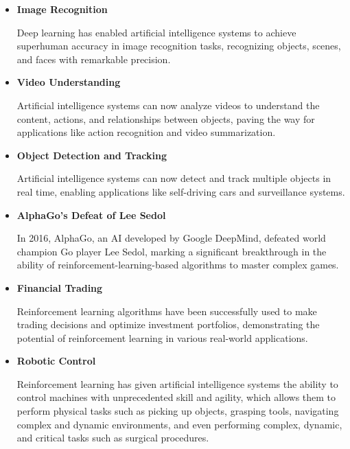 \documentclass[masterthesis]{fer}
\begin{document}
\begin{itemize}
    \item \textbf{Image Recognition}
    
    Deep learning has enabled artificial intelligence systems
    to achieve superhuman accuracy in image recognition tasks,
    recognizing objects, scenes, and faces with remarkable precision.

    \item \textbf{Video Understanding}
    
    Artificial intelligence systems can now
    analyze videos to understand the content, actions, and relationships between objects,
    paving the way for applications like action recognition and video summarization.

    \item \textbf{Object Detection and Tracking}
    
    Artificial intelligence systems can now
    detect and track multiple objects in real time,
    enabling applications like self-driving cars and surveillance systems.
    
    \item \textbf{AlphaGo's Defeat of Lee Sedol}
    
    In 2016, AlphaGo, an AI developed by Google DeepMind, defeated world champion Go player Lee Sedol, marking a significant breakthrough in the ability of reinforcement-learning-based algorithms to master complex games.
    
    \item \textbf{Financial Trading}
    
    Reinforcement learning algorithms have been successfully used to make trading decisions and optimize investment portfolios, demonstrating the potential of reinforcement learning in various real-world applications.
    
    \item \textbf{Robotic Control}
    
    Reinforcement learning has given artificial intelligence systems the ability to control machines with unprecedented skill and agility, which allows them to perform physical tasks such as picking up objects, grasping tools, navigating complex and dynamic environments, and even performing complex, dynamic, and critical tasks such as surgical procedures.
    \cite{saeidi_opfermann_kam_wei_leonard_hsieh_kang_krieger_2022}
\end{itemize}
\end{document}
